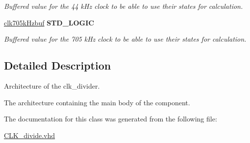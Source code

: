 \begin{DoxyCompactItemize}
\begin{DoxyCompactList}\small\item\em Buffered value for the 44 k\-Hz clock to be able to use their states for calculation. \end{DoxyCompactList}\item 
\hypertarget{classclk__divide_1_1clk__div__DAC_a7683c8432ba1dc0ce9ac4515e56c9d4f}{\hyperlink{classclk__divide_1_1clk__div__DAC_a7683c8432ba1dc0ce9ac4515e56c9d4f}{clk705k\-Hzbuf} {\bfseries \textcolor{comment}{S\-T\-D\-\_\-\-L\-O\-G\-I\-C}\textcolor{vhdlchar}{ }} }\label{classclk__divide_1_1clk__div__DAC_a7683c8432ba1dc0ce9ac4515e56c9d4f}

\begin{DoxyCompactList}\small\item\em Buffered value for the 705 k\-Hz clock to be able to use their states for calculation. \end{DoxyCompactList}\end{DoxyCompactItemize}


\subsection{Detailed Description}
Architecture of the clk\-\_\-divider. 

The architecture containing the main body of the component. 

The documentation for this class was generated from the following file\-:\begin{DoxyCompactItemize}
\item 
\hyperlink{CLK__divide_8vhd}{C\-L\-K\-\_\-divide.\-vhd}\end{DoxyCompactItemize}
